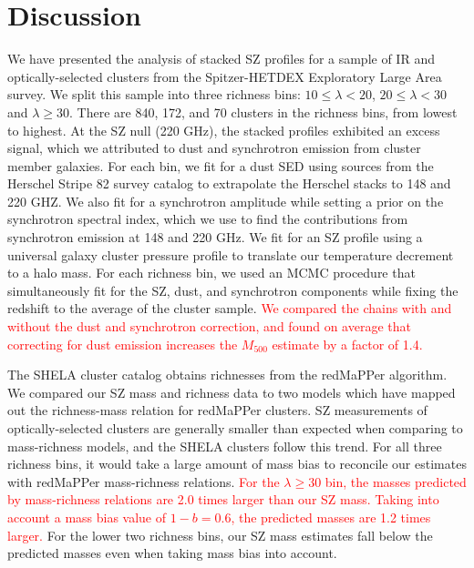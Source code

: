 \documentclass[a4paper,fleqn,usenatbib]{mnras}
\newcommand{\revisit}{\textcolor{red}}
\begin{document}

\section{Discussion} \label{sec:conclusions}
We have presented the analysis of stacked SZ profiles for a sample of IR and optically-selected clusters from the Spitzer-HETDEX Exploratory Large Area survey. 
We split this sample into three richness bins: $10 \leq \lambda < 20$, $20 \leq \lambda < 30$ and $\lambda \geq 30$. There are 840, 172, and 70 clusters in the richness bins, from lowest to highest. 
At the SZ null (220 GHz), the stacked profiles exhibited an excess signal, which we attributed to dust and synchrotron emission from cluster member galaxies. 
For each bin, we fit for a dust SED using sources from the Herschel Stripe 82 survey catalog to extrapolate the Herschel stacks to 148 and 220 GHZ. 
We also fit for a synchrotron amplitude while setting a prior on the synchrotron spectral index, which we use to find the contributions from synchrotron emission at 148 and 220 GHz. 
We fit for an SZ profile using a universal galaxy cluster pressure profile to translate our temperature decrement to a halo mass. 
For each richness bin, we used an MCMC procedure that simultaneously fit for the SZ, dust, and synchrotron components while fixing the redshift to the average of the cluster sample.  
\revisit{We compared the chains with and without the dust and synchrotron correction, and found on average that correcting for dust emission increases the $M_{500}$ estimate by a factor of 1.4. }


The SHELA cluster catalog obtains richnesses from the redMaPPer algorithm. 
We compared our SZ mass and richness data to two models which have mapped out the richness-mass relation for redMaPPer clusters. 
SZ measurements of optically-selected clusters are generally smaller than expected when comparing to mass-richness models, and the SHELA clusters follow this trend. 
For all three richness bins, it would take a large amount of mass bias to reconcile our estimates with redMaPPer mass-richness relations. 
\revisit{For the $\lambda \geq 30$ bin, the masses predicted by mass-richness relations are 2.0 times larger than our SZ mass.
Taking into account a mass bias value of $1-b = 0.6$, the predicted masses are 1.2 times larger.}
For the lower two richness bins, our SZ mass estimates fall below the predicted masses even when taking mass bias into account.
\end{document}
